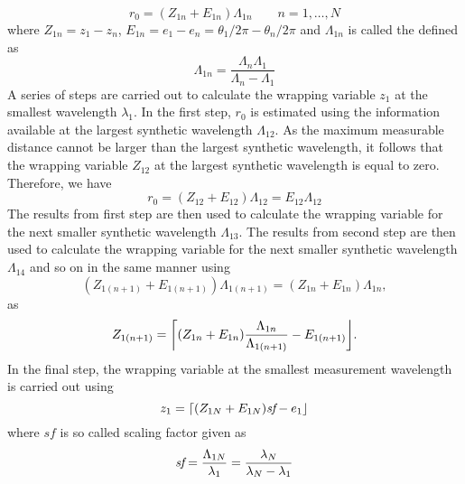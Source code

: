 \[
r_0 = (Z_{1n} + E_{1n})\Lambda_{1n} \qquad n=1,\ldots, N
\]
where $Z_{1n} = z_1 - z_n$, $E_{1n}= e_1 - e_n = \theta_{1}/2\pi - \theta_{n}/2\pi$ and $\Lambda_{1n}$ is called the  defined as
\[
\Lambda_{1n} = \dfrac{\Lambda_n\Lambda_1}{\Lambda_n - \Lambda_1}
\]
A series of steps are carried out to calculate the wrapping variable $z_1$ at the smallest wavelength $\lambda_1$. In the first step, $r_0$ is estimated using the information available at the largest synthetic wavelength $\Lambda_{12}$. As the maximum measurable distance cannot be larger than the largest synthetic wavelength, it follows that the wrapping variable $Z_{12}$ at the largest synthetic wavelength is equal to zero. Therefore, we have~\cite{Falaggis-generalized-th-of-PU-2012}
\[
r_0 = (Z_{12} + E_{12}) \Lambda_{12} = E_{12} \Lambda_{12}
\]
The results from first step are then used to calculate the wrapping variable for the next smaller synthetic wavelength $\Lambda_{13}$.
The results from second step are then used to calculate the wrapping variable for the next smaller synthetic wavelength $\Lambda_{14}$ and so on in the same manner using
\[
(Z_{1(n+1)} + E_{1(n+1)})\Lambda_{1(n+1)} = (Z_{1n} + E_{1n})\Lambda_{1n},
\]
as
\[
Z_{1(n+1)} = {\left\lceil  (Z_{1n} + E_{1n}) \dfrac{\Lambda_{1n}}{\Lambda_{1(n+1)}} -  E_{1(n+1)} \right\rfloor}.
\]
In the final step, the wrapping variable at the smallest measurement wavelength is carried out using
\[
z_1 = {\left\lceil (Z_{1N} + E_{1N})\emph{sf}  - e_1  \right\rfloor}
\]
where $sf$ is so called scaling factor given as
\[
\emph{sf} = \dfrac{\Lambda_{1N}}{\lambda_1} = \dfrac{\lambda_{N}}{\lambda_{N} - \lambda_1}
\]

